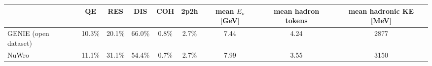 \begin{tabular}{lcccccccc}
\toprule
 & QE & RES & DIS & COH & 2p2h & mean $E_\nu$ [GeV] & mean hadron tokens & mean hadronic KE [MeV] \\
\midrule
GENIE (open dataset) & 10.3\% & 20.1\% & 66.0\% & 0.8\% & 2.7\% & 7.44 & 4.24 & 2877 \\
NuWro & 11.1\% & 31.1\% & 54.4\% & 0.7\% & 2.7\% & 7.99 & 3.55 & 3150 \\
\bottomrule
\end{tabular}
